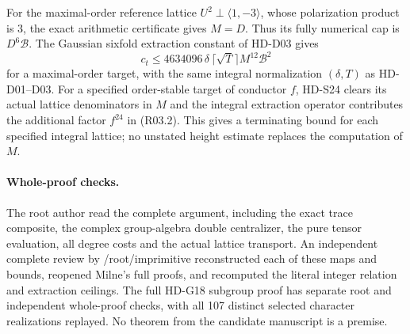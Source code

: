 For the maximal-order reference lattice
$U^2\perp\langle1,-3\rangle$, whose polarization product is $3$,
the exact arithmetic certificate gives $M=D$. Thus its fully
numerical cap is $D^6\mathcal B$.
The Gaussian sixfold extraction constant of HD-D03 gives
\begin{equation}
 c_t\le4634096\,\delta\,\lceil\sqrt T\rceil
                          M^{12}\mathcal B^2          \tag{R03.2}
\end{equation}
for a maximal-order target, with the same integral normalization
$(\delta,T)$ as HD-D01--D03. For a specified order-stable target
of conductor $f$, HD-S24 clears its actual lattice denominators
in $M$ and the integral extraction operator contributes the
additional factor $f^{24}$ in (R03.2).
This gives a terminating bound for each specified integral lattice;
no unstated height estimate replaces the computation of $M$.

\paragraph{Whole-proof checks.}
The root author read the complete argument, including the exact
trace composite, the complex group-algebra double centralizer,
the pure tensor evaluation, all degree costs and the actual
lattice transport. An independent complete review by
/root/imprimitive reconstructed each of these maps and bounds,
reopened Milne's full proofs, and recomputed the literal integer
relation and extraction ceilings. The full HD-G18 subgroup proof
has separate root and independent whole-proof checks, with all
107 distinct selected character realizations replayed. No theorem
from the candidate manuscript is a premise.
